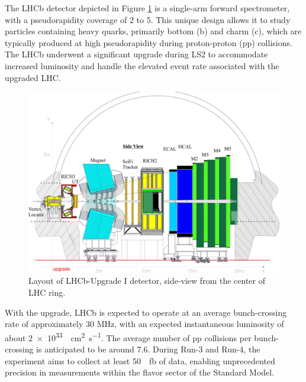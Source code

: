 The LHCb detector depicted in Figure \ref{fig:lhcb-detector} is a single-arm forward spectrometer, with a pseudorapidity coverage of 2 to 5. This unique design allows it to study particles containing heavy quarks, primarily bottom (b) and charm (c), which are typically produced at high pseudorapidity during proton-proton (pp) collisions. The LHCb underwent a significant upgrade during LS2 to accommodate increased luminosity and handle the elevated event rate associated with the upgraded LHC.
\begin{figure}[h]
    \centering
    \includegraphics[width=\textwidth]{figures/UT-upgrade-detector-scaled.jpeg}
    \caption{Layout of LHCb-Upgrade I detector, side-view from the center of LHC ring.}
    \label{fig:lhcb-detector}
\end{figure}
With the upgrade, LHCb is expected to operate at an average bunch-crossing rate of approximately 30 MHz, with an expected instantaneous luminosity of about \SI{2e33}{\per\centi\meter\squared\per\second}. The average number of pp collisions per bunch-crossing is anticipated to be around 7.6. During Run-3 and Run-4, the experiment aims to collect at least \SI{50}{\per\femto\barn} of data, enabling unprecedented precision in measurements within the flavor sector of the Standard Model.

